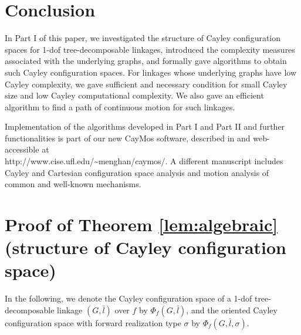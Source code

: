 \documentclass[secthm,amsthm,english]{article}
\theoremstyle{definition}
\theoremstyle{remark}
\begin{document}
\section{Conclusion}

In Part I of this paper, 
we investigated the structure of Cayley configuration spaces for 1-dof tree-decomposable linkages, 
introduced the complexity measures associated with the underlying graphs, 
and formally gave algorithms to obtain such Cayley configuration spaces. 
For linkages whose underlying graphs have low Cayley complexity, 
we gave sufficient and necessary condition for small Cayley size and low Cayley computational complexity. 
We also gave an efficient algorithm to find a path of continuous motion for such linkages.


Implementation of the algorithms developed in Part I and Part II and further functionalities is part of our new CayMos software, described in \cite{bib:caymos} 
and web-accessible at \\http://www.cise.ufl.edu/\~{}menghan/caymos/. 
A different manuscript \cite{bib:beest} includes Cayley and Cartesian configuration space analysis and motion analysis of common and well-known mechanisms. 






\appendix

\section{Proof of Theorem \ref{lem:algebraic} (structure of Cayley configuration space)}
\label{sec:Proof-for-lemma}

In the following, we denote the Cayley configuration space of a 1-dof tree-decomposable linkage $(G, \bar{l})$ over $f$ by $\Phi_{f}(G,\bar{l})$, and the oriented Cayley configuration space with forward realization type $\sigma$ by $\Phi_f(G, \bar{l}, \sigma)$.
\end{document}
